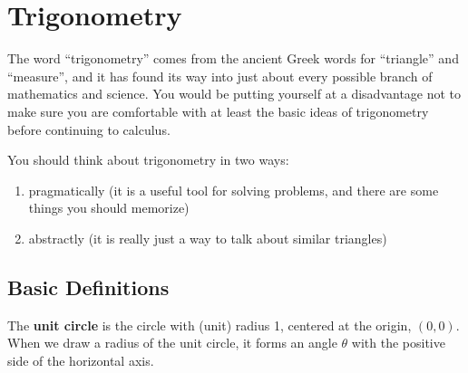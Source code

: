 \documentclass{article}
\theoremstyle{definition}
\theoremstyle{definition}
\begin{document}
\section{Trigonometry}

The word ``trigonometry'' comes from the ancient Greek words for ``triangle'' and ``measure'', and it has found its way into just about every possible branch of mathematics and science. You would be putting yourself at a disadvantage not to make sure you are comfortable with at least the basic ideas of trigonometry before continuing to calculus.

You should think about trigonometry in two ways:
\begin{enumerate}
\item pragmatically (it is a useful tool for solving problems, and there are some things you should memorize)
\item abstractly (it is really just a way to talk about similar triangles)
\end{enumerate}

\subsection{Basic Definitions}
The \textbf{unit circle} is the circle with (unit) radius 1, centered at the origin, $(0,0)$. When we draw a radius of the unit circle, it forms an angle $\theta$ with the positive side of the horizontal axis.
\end{document}
